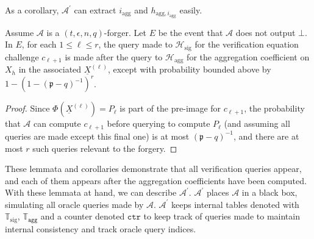 \documentclass{iacrtrans}
\theoremstyle{definition}
\numberwithin{theorem}{subsection}
\numberwithin{lemma}{theorem}
\newcommand{\adversary}{\mathcal{A}}
\newcommand{\p}{\mathfrak{p}}
\begin{document}
As a corollary, $\adversary^\prime$ can extract $i_{\text{agg}}$ and $h_{\text{agg}, i_{\text{agg}}}$ easily.

\begin{lemma}
Assume $\adversary$ is a $(t, \epsilon, n, q)$-forger. Let $E$ be the event that $\adversary$ does not output $\bot$. In $E$, for each $1 \leq \ell \leq r$, the query made to $\mathcal{H}_{\text{sig}}$ for the verification equation challenge $c_{\ell+1}$ is made after the query to $\mathcal{H}_{\text{agg}}$ for the aggregation coefficient on $X_h$ in the associated $\underline{X}^{(\ell)}$, except with probability bounded above by $1-(1-(\p - q)^{-1})^{r}$.
\end{lemma}
\begin{proof} Since $\Phi(\underline{X}^{(\ell)}) = P_\ell$ is part of the pre-image for $c_{\ell+1}$, the probability that $\adversary$ can compute $c_{\ell+1}$ before querying to compute $P_\ell$ (and assuming all queries are made except this final one) is at most  $(\p - q)^{-1}$, and there are at most $r$ such queries relevant to the forgery.
\end{proof}

These lemmata and corollaries demonstrate that all verification queries appear, and each of them appears after the aggregation coefficients have been computed. With these lemmata at hand, we can   describe $\adversary^\prime$. $\adversary^\prime$ places $\adversary$ in a black box, simulating all oracle queries made by $\adversary$. $\adversary^\prime$ keeps internal tables denoted with $\mathbb{T}_{\text{sig}}$, $\mathbb{T}_{\texttt{agg}}$ and a counter denoted $\texttt{ctr}$ to keep track of queries made to maintain internal consistency and track oracle query indices.
\end{document}
